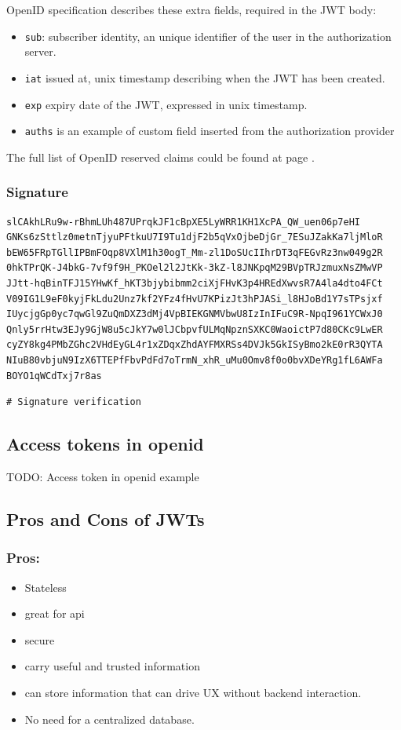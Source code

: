 \documentclass[11pt]{style}
\begin{document}
OpenID specification describes these extra fields, required in the JWT body:
\begin{itemize}
    \item \texttt{sub}: subscriber identity, an unique identifier of the user in
        the authorization server.
    \item \texttt{iat} issued at, unix timestamp describing when the JWT has
        been created.
    \item \texttt{exp} expiry date of the JWT, expressed in unix timestamp.
    \item \texttt{auths} is an example of custom field inserted from the authorization
        provider
\end{itemize}

The full list of OpenID reserved claims could be found at page \pageref{openid}.

\subsubsection{Signature}
\begin{lstlisting}
slCAkhLRu9w-rBhmLUh487UPrqkJF1cBpXE5LyWRR1KH1XcPA_QW_uen06p7eHI
GNKs6zSttlz0metnTjyuPFtkuU7I9Tu1djF2b5qVxOjbeDjGr_7ESuJZakKa7ljMloR
bEW65FRpTGllIPBmFOqp8VXlM1h30ogT_Mm-zl1DoSUcIIhrDT3qFEGvRz3nw049g2R
0hkTPrQK-J4bkG-7vf9f9H_PKOel2l2JtKk-3kZ-l8JNKpqM29BVpTRJzmuxNsZMwVP
JJtt-hqBinTFJ15YHwKf_hKT3bjybibmm2ciXjFHvK3p4HREdXwvsR7A4la4dto4FCt
V09IG1L9eF0kyjFkLdu2Unz7kf2YFz4fHvU7KPizJt3hPJASi_l8HJoBd1Y7sTPsjxf
IUycjgGp0yc7qwGl9ZuQmDXZ3dMj4VpBIEKGNMVbwU8IzInIFuC9R-NpqI961YCWxJ0
Qnly5rrHtw3EJy9GjW8u5cJkY7w0lJCbpvfULMqNpznSXKC0WaoictP7d80CKc9LwER
cyZY8kg4PMbZGhc2VHdEyGL4r1xZDqxZhdAYFMXRSs4DVJk5GkISyBmo2kE0rR3QYTA
NIuB80vbjuN9IzX6TTEPfFbvPdFd7oTrmN_xhR_uMu0Omv8f0o0bvXDeYRg1fL6AWFa
BOYO1qWCdTxj7r8as
\end{lstlisting}

\begin{lstlisting}
# Signature verification
\end{lstlisting}

\subsection{Access tokens in openid}
TODO: Access token in openid example

\subsection{Pros and Cons of JWTs}
\subsubsection{Pros:}
\begin{itemize}
    \item Stateless
    \item great for api
    \item secure
    \item carry useful and trusted information
    \item can store information that can drive UX without backend interaction.
    \item No need for a centralized database.
\end{itemize}
\end{document}
